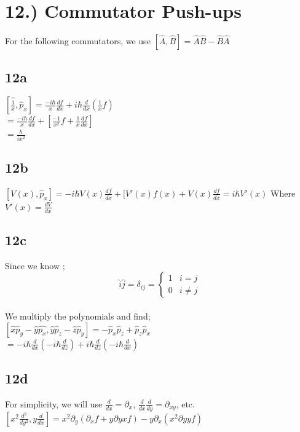 \documentclass[10pt]{article}
\begin{document}
\pagebreak

\section*{12.) Commutator Push-ups}
For the following commutators, we use $[\hat{A},\hat{B}]=\hat{A}\hat{B}-\hat{B}\hat{A}$\\
\subsection*{12a}
$[\hat{\frac{1}{x}},\hat{p}_x]=\frac{-i\hbar}{x}\frac{df}{dx}+i\hbar\frac{d}{dx}(\frac{1}{x}f)$\\
$=\frac{-i\hbar}{x}\frac{df}{dx}+[\frac{-1}{x^2}f+\frac{1}{x}\frac{df}{dx}]$\\
$=\frac{\hbar}{ix^2}$\\
\subsection*{12b}
$[V(x),\hat{p}_x]=-i\hbar V(x)\frac{df}{dx}+[V'(x)f(x)+V(x)\frac{df}{dx}=i\hbar V'(x)$ Where $V'(x)=\frac{dV}{dx}$\\
\subsection*{12c}
Since we know ;
\[
\hat{i}\hat{j}=\delta_{ij}=
\begin{cases}
1 & i=j\\
0 & i\neq j
\end{cases}
\]
\\
We multiply the polynomials and find;\\

$[\hat{x}\hat{p}_y-\hat{y}\hat{p_x},\hat{y}\hat{p}_z-\hat{z}\hat{p}_y]=-\hat{p}_x\hat{p}_z+\hat{p}_z\hat{p}_x$\\

$=-i\hbar\frac{d}{dx}(-i\hbar\frac{d}{dz})+i\hbar\frac{d}{dz}(-i\hbar\frac{d}{dx})$\\
\subsection*{12d}
For simplicity, we will use $\frac{d}{dx}=\partial_x$, $\frac{d}{dx}\frac{d}{dy}=\partial_{xy}$, etc.\\

$[x^2\frac{d^2}{dy^2},y\frac{d}{dx}]=x^2\partial_y(\partial_xf+y\partial{yx}f)-y\partial_x(x^2\partial{yy}f)$\\
\end{document}
